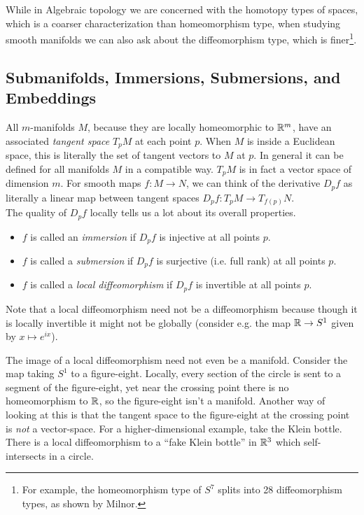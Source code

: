 \documentclass{amsart}
\begin{document}
While in Algebraic topology we are concerned with the homotopy types of spaces, which is a coarser characterization than homeomorphism type, when studying smooth manifolds we can also ask about the diffeomorphism type, which is finer\footnote{For example, the homeomorphism type of $S^7$ splits into 28 diffeomorphism types, as shown by Milnor.}.

\subsection{Submanifolds, Immersions, Submersions, and Embeddings}
All $m$-manifolds $M$, because they are locally homeomorphic to $\mathbb{R}^m$, have an associated \textit{tangent space} $T_pM$ at each point $p$. When $M$ is inside a Euclidean space, this is literally the set of tangent vectors to $M$ at $p$. In general it can be defined for all manifolds $M$ in a compatible way. $T_pM$ is in fact a vector space of dimension $m$. For smooth maps $f:M\to N$, we can think of the derivative $D_pf$ as literally a linear map between tangent spaces $D_pf :T_p M \to T_{f(p)}N$.\\

The quality of $D_pf$ locally tells us a lot about its overall properties.
\begin{itemize}
	\item $f$ is called an \textit{immersion} if $D_pf$ is injective at all points $p$.
	\item $f$ is called a \textit{submersion} if $D_pf$ is surjective (i.e. full rank) at all points $p$.
	\item $f$ is called a \textit{local diffeomorphism} if $D_pf$ is invertible at all points $p$.
\end{itemize}
Note that a local diffeomorphism need not be a diffeomorphism because though it is locally invertible it might not be globally (consider e.g. the map $\mathbb{R}\to S^1$ given by $x\mapsto e^{ix}$).

The image of a local diffeomorphism need not even be a manifold. Consider the map taking $S^1$ to a figure-eight. Locally, every section of the circle is sent to a segment of the figure-eight, yet near the crossing point there is no homeomorphism to $\mathbb{R}$, so the figure-eight isn't a manifold. Another way of looking at this is that the tangent space to the figure-eight at the crossing point is \textit{not} a vector-space. For a higher-dimensional example, take the Klein bottle. There is a local diffeomorphism to a ``fake Klein bottle'' in $\mathbb{R}^3$ which self-intersects in a circle.
\end{document}
